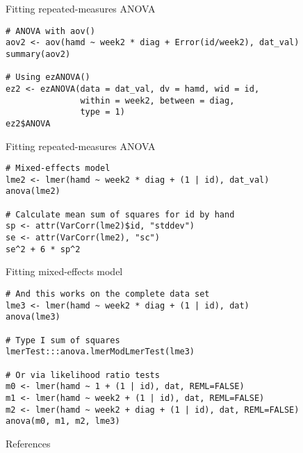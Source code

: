 \documentclass[aspectratio=169]{beamer}
\begin{document}
{

\begin{frame}[fragile]{Fitting repeated-measures ANOVA}
  \begin{lstlisting}
# ANOVA with aov()
aov2 <- aov(hamd ~ week2 * diag + Error(id/week2), dat_val)
summary(aov2)

# Using ezANOVA()
ez2 <- ezANOVA(data = dat_val, dv = hamd, wid = id,
               within = week2, between = diag,
               type = 1)
ez2$ANOVA
  \end{lstlisting}
\end{frame}

\begin{frame}[fragile]{Fitting repeated-measures ANOVA}
  \begin{lstlisting}
# Mixed-effects model
lme2 <- lmer(hamd ~ week2 * diag + (1 | id), dat_val)
anova(lme2)

# Calculate mean sum of squares for id by hand
sp <- attr(VarCorr(lme2)$id, "stddev")
se <- attr(VarCorr(lme2), "sc")
se^2 + 6 * sp^2
  \end{lstlisting}
\end{frame}

\begin{frame}[fragile]{Fitting mixed-effects model}
  \begin{lstlisting}
# And this works on the complete data set
lme3 <- lmer(hamd ~ week2 * diag + (1 | id), dat)
anova(lme3)

# Type I sum of squares
lmerTest:::anova.lmerModLmerTest(lme3)

# Or via likelihood ratio tests
m0 <- lmer(hamd ~ 1 + (1 | id), dat, REML=FALSE)
m1 <- lmer(hamd ~ week2 + (1 | id), dat, REML=FALSE)
m2 <- lmer(hamd ~ week2 + diag + (1 | id), dat, REML=FALSE)
anova(m0, m1, m2, lme3)
  \end{lstlisting}
\end{frame}

}

% 
% 
% 

\begin{frame}{References}


\vfill
\end{frame}
\end{document}
